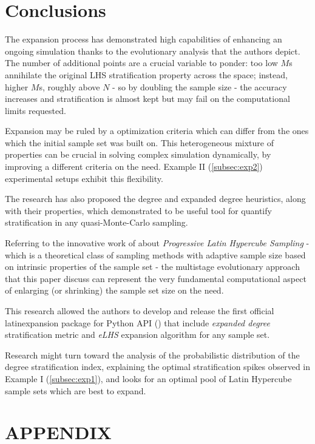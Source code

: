 \documentclass[12pt]{extarticle}
\begin{document}
\section{Conclusions}
\label{sec:conclusions}
The expansion process has demonstrated high capabilities of enhancing an ongoing simulation thanks to the evolutionary analysis that the authors depict. The number of additional points are a crucial variable to ponder: too low $M$s annihilate the original LHS stratification property across the space; instead, higher $M$s, roughly above $N$ - so by doubling the sample size - the accuracy increases and stratification is almost kept but may fail on the computational limits requested.

Expansion may be ruled by a optimization criteria which can differ from the ones which the initial sample set was built on. This heterogeneous mixture of properties can be crucial in solving complex simulation dynamically, by improving a different criteria on the need. Example II (\cref{subsec:exp2}) experimental setups exhibit this flexibility.

The research has also proposed the degree and expanded degree heuristics, along with their properties, which demonstrated to be useful tool for quantify stratification in any quasi-Monte-Carlo sampling. 

Referring to the innovative work of  about \textit{Progressive Latin Hypercube Sampling} - which is a theoretical class of sampling methods with adaptive sample size based on intrinsic properties of the sample set - the multistage evolutionary approach that this paper discuss can represent the very fundamental computational aspect of enlarging (or shrinking) the sample set size on the need.

This research allowed the authors to develop and release the first official latinexpansion package for Python API () that include \textit{expanded degree} stratification metric and \textit{eLHS} expansion algorithm for any sample set.

Research might turn toward the analysis of the probabilistic distribution of the degree stratification index, explaining the optimal stratification spikes observed in Example I (\cref{subsec:exp1}), and looks for an optimal pool of Latin Hypercube sample sets which are best to expand.

\section{APPENDIX}
\label{appendix}
\end{document}
